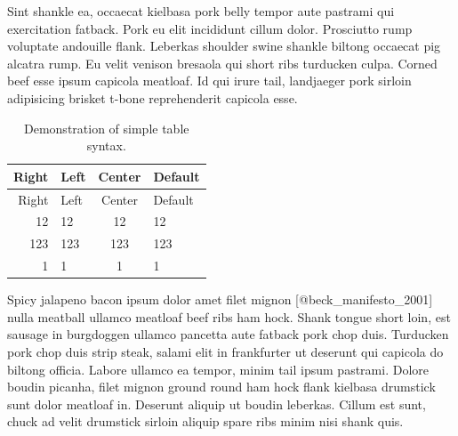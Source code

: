 \documentclass[paper]{ijdc-v9}
\begin{document}
Sint shankle ea, occaecat kielbasa pork belly tempor aute pastrami qui
exercitation fatback. Pork eu elit incididunt cillum dolor. Prosciutto
rump voluptate andouille flank. Leberkas shoulder swine shankle biltong
occaecat pig alcatra rump. Eu velit venison bresaola qui short ribs
turducken culpa. Corned beef esse ipsum capicola meatloaf. Id qui irure
tail, landjaeger pork sirloin adipisicing brisket t-bone reprehenderit
capicola esse.

\begin{longtable}[c]{@{}rlcl@{}}
\caption{Demonstration of simple table syntax.}\tabularnewline
\toprule
Right & Left & Center & Default\tabularnewline
\midrule
\endfirsthead
\toprule
Right & Left & Center & Default\tabularnewline
\midrule
\endhead
12 & 12 & 12 & 12\tabularnewline
123 & 123 & 123 & 123\tabularnewline
1 & 1 & 1 & 1\tabularnewline
\bottomrule
\end{longtable}

Spicy jalapeno bacon ipsum dolor amet filet mignon
{[}@beck\_manifesto\_2001{]} nulla meatball ullamco meatloaf beef ribs
ham hock. Shank tongue short loin, est sausage in burgdoggen ullamco
pancetta aute fatback pork chop duis. Turducken pork chop duis strip
steak, salami elit in frankfurter ut deserunt qui capicola do biltong
officia. Labore ullamco ea tempor, minim tail ipsum pastrami. Dolore
boudin picanha, filet mignon ground round ham hock flank kielbasa
drumstick sunt dolor meatloaf in. Deserunt aliquip ut boudin leberkas.
Cillum est sunt, chuck ad velit drumstick sirloin aliquip spare ribs
minim nisi shank quis.
\end{document}
